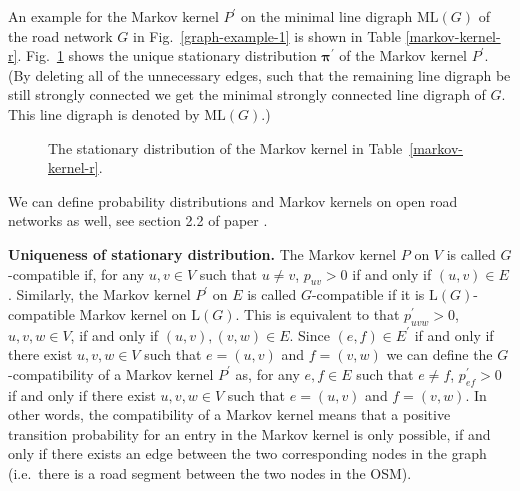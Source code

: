 \documentclass[b5paper,12pt]{report}
\theoremstyle{definition}
\newcommand{\bpi}{\boldsymbol{\pi}}
\begin{document}
An example for the Markov kernel $P^\prime$ on the minimal line digraph $\text{ML}(G)$ of the road network $G$ in Fig.~\ref{graph-example-1} is shown in Table \ref{markov-kernel-r}. Fig.~\ref{rho_graph} shows the unique stationary distribution $\bpi^\prime$ of the Markov kernel $P^\prime$. (By deleting all of the unnecessary edges, such that the remaining line digraph be still strongly connected we get the minimal strongly connected line digraph of $G$. This line digraph is denoted by $\text{ML} (G)$.)

\begin{figure}
\centering
{}
\caption{The stationary distribution of the Markov kernel in Table~\ref{markov-kernel-r}.}
\label{rho_graph}
\end{figure}

We can define probability distributions and Markov kernels on open road networks as well, see section 2.2 of paper \cite{traffic-paper}.

\smallskip

\textbf{Uniqueness of stationary distribution.} The Markov kernel $P$ on $V$ is called $G$-compatible if, for any $u,v\in V$ such that $u\neq v$, $p_{uv}>0$ if and only if $(u,v)\in E$. Similarly, the Markov kernel $P^\prime$ on $E$ is called $G$-compatible if it is $\text{L}(G)$-compatible Markov kernel on $\text{L}(G)$. This is equivalent to that $p^\prime_{uvw}>0$, $u,v,w\in V$, if and only if $(u,v),(v,w)\in E$. Since $(e,f)\in E^\prime$ if and only if there exist $u,v,w\in V$ such that $e=(u,v)$ and $f=(v,w)$ we can define the $G$-compatibility of a Markov kernel $P^\prime$ as, for any $e,f\in E$ such that $e\neq f$, $p^\prime_{ef}>0$ if and only if there exist $u,v,w\in V$ such that $e=(u,v)$ and $f=(v,w)$. In other words, the compatibility of a Markov kernel means that a positive transition probability for an entry in the Markov kernel is only possible, if and only if there exists an edge between the two corresponding nodes in the graph (i.e.~there is a road segment between the two nodes in the OSM).
\end{document}
